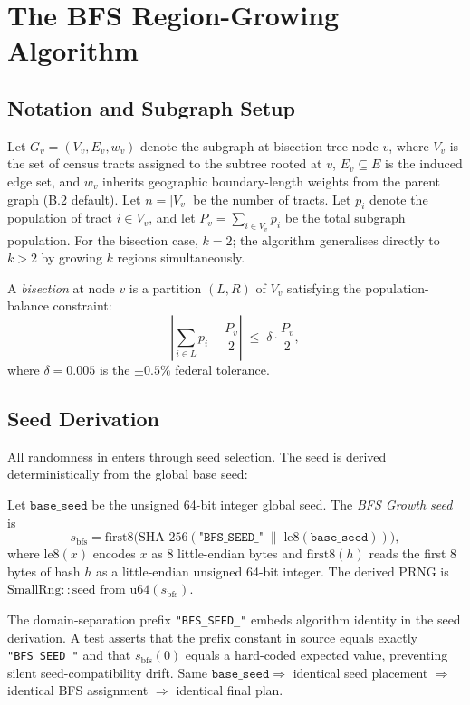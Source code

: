 \section{The BFS Region-Growing Algorithm}
\label{sec:algorithm}

\subsection{Notation and Subgraph Setup}

Let $G_v = (V_v, E_v, w_v)$ denote the subgraph at bisection tree node $v$,
where $V_v$ is the set of census tracts assigned to the subtree rooted at $v$,
$E_v \subseteq E$ is the induced edge set, and $w_v$ inherits geographic
boundary-length weights from the parent graph (B.2 default).
Let $n = |V_v|$ be the number of tracts.
Let $p_i$ denote the population of tract $i \in V_v$, and let
$P_v = \sum_{i \in V_v} p_i$ be the total subgraph population.
For the bisection case, $k = 2$; the algorithm generalises directly to
$k > 2$ by growing $k$ regions simultaneously.

A \emph{bisection} at node $v$ is a partition $(L, R)$ of $V_v$ satisfying
the population-balance constraint:
\[
  \left|\sum_{i \in L} p_i - \frac{P_v}{2}\right|
  \;\le\;
  \delta \cdot \frac{P_v}{2},
\]
where $\delta = 0.005$ is the $\pm 0.5\%$ federal tolerance.

\subsection{Seed Derivation}

All randomness in \bfsg{} enters through seed selection.
The seed is derived deterministically from the global base seed:

\begin{definition}
\label{def:bfs-seed}
Let $\mathtt{base\_seed}$ be the unsigned 64-bit integer global seed.
The \emph{BFS Growth seed} is
\[
  s_{\mathrm{bfs}} = \mathrm{first8}\bigl(
    \mathrm{SHA\text{-}256}(
      \texttt{"BFS\_SEED\_"} \;\|\; \mathrm{le8}(\mathtt{base\_seed})
    )
  \bigr),
\]
where $\mathrm{le8}(x)$ encodes $x$ as 8 little-endian bytes and
$\mathrm{first8}(h)$ reads the first 8 bytes of hash $h$ as a
little-endian unsigned 64-bit integer.
The derived PRNG is $\mathrm{SmallRng::seed\_from\_u64}(s_{\mathrm{bfs}})$.
\end{definition}

The domain-separation prefix \texttt{"BFS\_SEED\_"} embeds algorithm
identity in the seed derivation.
A test asserts that the prefix constant in source equals exactly
\texttt{"BFS\_SEED\_"} and that $s_{\mathrm{bfs}}(0)$ equals a
hard-coded expected value, preventing silent seed-compatibility drift.
Same $\mathtt{base\_seed} \Rightarrow$ identical seed placement
$\Rightarrow$ identical BFS assignment $\Rightarrow$ identical final plan.

